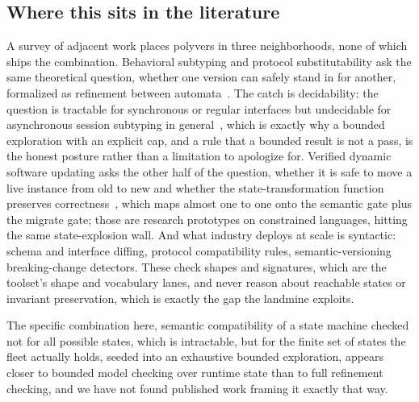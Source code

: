 \documentclass[11pt]{article}
\newcommand{\tool}[1]{\textsf{#1}}
\begin{document}
\subsection{Where this sits in the literature}

A survey of adjacent work places \tool{polyvers} in three neighborhoods, none
of which ships the combination. Behavioral subtyping and protocol
substitutability ask the same theoretical question, whether one version can
safely stand in for another, formalized as refinement between
automata~\cite{subtyping}. The catch is decidability: the question is tractable
for synchronous or regular interfaces but undecidable for asynchronous session
subtyping in general~\cite{session}, which is exactly why a bounded exploration
with an explicit cap, and a rule that a bounded result is not a pass, is the
honest posture rather than a limitation to apologize for. Verified dynamic
software updating asks the other half of the question, whether it is safe to
move a live instance from old to new and whether the state-transformation
function preserves correctness~\cite{dsu}, which maps almost one to one onto the
semantic gate plus the migrate gate; those are research prototypes on
constrained languages, hitting the same state-explosion wall. And what industry
deploys at scale is syntactic: schema and interface diffing, protocol
compatibility rules, semantic-versioning breaking-change detectors. These check
shapes and signatures, which are the toolset's shape and vocabulary lanes, and
never reason about reachable states or invariant preservation, which is exactly
the gap the landmine exploits.

The specific combination here, semantic compatibility of a state machine checked
not for all possible states, which is intractable, but for the finite set of
states the fleet actually holds, seeded into an exhaustive bounded exploration,
appears closer to bounded model checking over runtime state than to full
refinement checking, and we have not found published work framing it exactly
that way.
\end{document}
